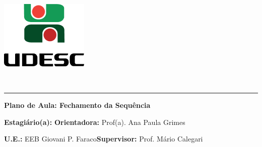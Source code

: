 \documentclass[
12pt,				%
openright,			%
oneside,			%
a4paper,			%
chapter=TITLE,		%
english,			%
brazil				%
]{abntex2}
\begin{document}
\thispagestyle{empty}
\begin{center}
	\begin{minipage}[!]{\linewidth}
		\begin{minipage}[!]{.19\linewidth}
			\includegraphics[width=\linewidth]{img/logo.png}           
		\end{minipage}
		\begin{minipage}[!]{.8\linewidth}
			\center
			\ABNTEXchapterfont\normalsize\MakeUppercase{\imprimirinstituicao}
			\par
			\vspace*{10pt}                     
			\ABNTEXchapterfont\normalsize\MakeUppercase{\centro}
			\par
			\vspace*{10pt}           
			\ABNTEXchapterfont\normalsize\MakeUppercase{\disciplina}
		\end{minipage}        
	\end{minipage}
	\\ \vspace{0.5cm}
	\rule{\textwidth}{.5pt}   
\end{center}
\textual
\begin{center}
	\textbf{Plano de Aula: Fechamento da Sequência}
\end{center}
\par\noindent\textbf{Estagiário(a):} \imprimirautor\hfill{}\textbf{Orientadora:} Prof(a). Ana Paula Grimes
\par\noindent\textbf{U.E.:} EEB Giovani P. Faraco\hfill{}\textbf{Supervisor:} Prof. Mário Calegari
\end{document}
